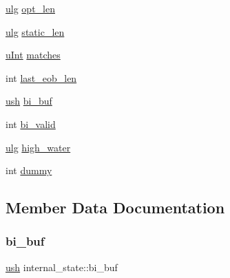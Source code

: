 \begin{DoxyCompactItemize}
\item 
\hyperlink{zutil_8h_abd6f60bf9450af2ecb94097a32c19a64}{ulg} \hyperlink{structinternal__state_a2f6efee5d2057aba8bca2c1a58cf418a}{opt\+\_\+len}
\item 
\hyperlink{zutil_8h_abd6f60bf9450af2ecb94097a32c19a64}{ulg} \hyperlink{structinternal__state_a8a83e269866761afa3a7b4641ba5ff91}{static\+\_\+len}
\item 
\hyperlink{zconf_8h_a87d141052bcd5ec8a80812a565c70369}{u\+Int} \hyperlink{structinternal__state_ac0f10ec7237615f6b632f2f4d14872ef}{matches}
\item 
int \hyperlink{structinternal__state_abf71c5672f4fce10f6f6a99eb30f72e1}{last\+\_\+eob\+\_\+len}
\item 
\hyperlink{zutil_8h_a3754180d606d4ed15468d15d9665aa2e}{ush} \hyperlink{structinternal__state_a6880946d081053778f5f544b04603d13}{bi\+\_\+buf}
\item 
int \hyperlink{structinternal__state_a241f3606e41a3aa0ef22868a41bd9a0f}{bi\+\_\+valid}
\item 
\hyperlink{zutil_8h_abd6f60bf9450af2ecb94097a32c19a64}{ulg} \hyperlink{structinternal__state_a85439cd585435b2590039339139d25cb}{high\+\_\+water}
\item 
int \hyperlink{structinternal__state_ab000a3e3c901dd063859521988ad7e52}{dummy}
\end{DoxyCompactItemize}


\subsection{Member Data Documentation}
\mbox{\label{structinternal__state_a6880946d081053778f5f544b04603d13}} 
\subsubsection{\texorpdfstring{bi\+\_\+buf}{bi\_buf}}
{\footnotesize\ttfamily \hyperlink{zutil_8h_a3754180d606d4ed15468d15d9665aa2e}{ush} internal\+\_\+state\+::bi\+\_\+buf}

\mbox{\label{structinternal__state_a241f3606e41a3aa0ef22868a41bd9a0f}} 

